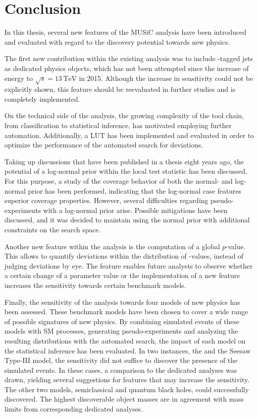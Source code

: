 
\chapter{Conclusion}
In this thesis, several new features of the \ac{MUSiC} analysis have been introduced and evaluated with regard to the discovery potential towards new physics. 

The first new contribution within the existing analysis was to include \Pqb-tagged jets as dedicated physics objects, which has not been attempted since the increase of energy to $\sqrt{s} = \SI{13}{\TeV}$ in 2015. Although the increase in sensitivity could not be explicitly shown, this feature should be reevaluated in further studies and is completely implemented.

On the technical side of the analysis, the growing complexity of the tool chain, from classification to statistical inference, has motivated employing further automation. Additionally, a \acl{LUT} has been implemented and evaluated in order to optimize the performance of the automated search for deviations.

Taking up discussions that have been published in a thesis eight years ago\cite{Schmitz:ModelUnspecificSearch}, the potential of a log-normal prior within the local test statistic has been discussed. For this purpose, a study of the coverage behavior of both the normal- and log-normal prior has been performed, indicating that the log-normal case features superior coverage properties. However, several difficulties regarding pseudo-experiments with a log-normal prior arise. Possible mitigations have been discussed, and it was decided to maintain using the normal prior with additional constraints on the search space.

Another new feature within the analysis is the computation of a global $p$-value. This allows to quantify deviations within the distribution of \ptilde-values, instead of judging deviations by eye. The feature enables future analysts to observe whether a certain change of a parameter value or the implementation of a new feature increases the sensitivity towards certain benchmark models.

Finally, the sensitivity of the analysis towards four models of new physics has been assessed. These benchmark models have been chosen to cover a wide range of possible signatures of new physics. By combining simulated events of these models with \acl{SM} processes, generating pseudo-experiments and analyzing the resulting distributions with the automated search, the impact of each model on the statistical inference has been evaluated. 
In two instances, the \PWprime and the Seesaw Type-III model, the sensitivity did not suffice to discover the presence of the simulated events. In these cases, a comparison to the dedicated analyses was drawn, yielding several suggestions for features that may increase the sensitivity.
The other two models, semiclassical and quantum black holes, could successfully discovered. The highest discoverable object masses are in agreement with mass limits from corresponding dedicated analyses.

